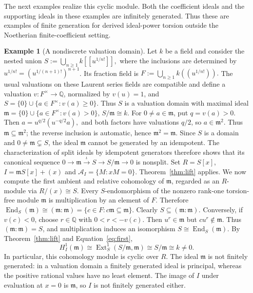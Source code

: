 \documentclass[11pt,reqno]{amsart}
\theoremstyle{definition}
\newtheorem{example}[theorem]{Example}
\theoremstyle{remark}
\begin{document}
The next examples realize this cyclic module. Both the coefficient ideals and the supporting ideals in these examples are infinitely generated. Thus these are examples of finite generation for derived ideal-power torsion outside the Noetherian finite-coefficient setting.
\begin{example}[A nondiscrete valuation domain]\label{ex:valuation}
Let $k$ be a field and consider the nested union \(S:=\displaystyle\bigcup_{n\geq1}k[[u^{1/n!}]],\) where the inclusions are determined by $u^{1/n!}= (u^{1/(n+1)!})^{n+1}$. Its fraction field is \(F:=\displaystyle\bigcup_{n\geq1}k((u^{1/n!})).\) The usual valuations on these Laurent series fields are compatible and define a valuation $v:F^\times\to\mathbb Q$, normalized by $v(u)=1$, and
\(S=\{0\}\cup\{a\in F^\times:v(a)\geq0\}.\) Thus $S$ is a valuation domain with maximal ideal \(\mathfrak m=\{0\}\cup\{a\in F^\times:v(a)>0\}\text{, } S/\mathfrak m\cong k.\)
For $0\neq a\in\mathfrak m$, put $q=v(a)>0$. Then \(a=u^{q/2}(u^{-q/2}a),\) and both factors have valuations $q/2$, so $a\in \mathfrak m^2$. Thus $\mathfrak m\subseteq\mathfrak m^2$; the reverse inclusion is automatic, hence $\mathfrak m^2=\mathfrak m$. Since $S$ is a domain and $0\neq\mathfrak m\subsetneq S$, the ideal $\mathfrak m$ cannot be generated by an idempotent. The characterization of split ideals by idempotent generators therefore shows that its canonical sequence \(  0\longrightarrow \mathfrak m \xrightarrow{\iota}S \longrightarrow S/\mathfrak m \longrightarrow 0\) is nonsplit. Set $R=S[x]$, $I=\mathfrak mS[x]+(x)$ and
$\mathcal A_I=\{M:xM=0\}$. Theorem~\ref{thm:lift} applies. We now compute the first ambient and relative cohomology of $\mathfrak m$,
regarded as an $R$-module via $R/(x)\cong S$. Every $S$-endomorphism of the nonzero rank-one torsion-free module
$\mathfrak m$ is multiplication by an element of $F$. Therefore
\(\operatorname{End}_S(\mathfrak m)\cong(\mathfrak m:\mathfrak m)=\{c\in F:c\mathfrak m\subseteq\mathfrak m\}.\) Clearly $S\subseteq(\mathfrak m:\mathfrak m)$. Conversely, if $v(c)<0$, choose $r\in\mathbb Q$ with $0<r<-v(c)$. Then $u^r\in\mathfrak m$ but $cu^r\notin\mathfrak m$.
Thus $(\mathfrak m:\mathfrak m)=S$, and multiplication induces an isomorphism $S\cong\operatorname{End}_S(\mathfrak m)$. By Theorem~\ref{thm:lift} and Equation~\eqref{eq:first}, \[H^1_I(\mathfrak m)\cong\operatorname{Ext}_S^1(S/\mathfrak m,\mathfrak m)\cong S/\mathfrak m\cong k\neq0.\]
In particular, this cohomology module is cyclic over $R$. The ideal $\mathfrak m$ is not finitely generated: in a valuation domain a finitely generated ideal is principal, whereas the positive rational values have no least element. The image of $I$ under evaluation at $x=0$ is $\mathfrak m$, so $I$ is not finitely generated either.
\end{example}
\end{document}
